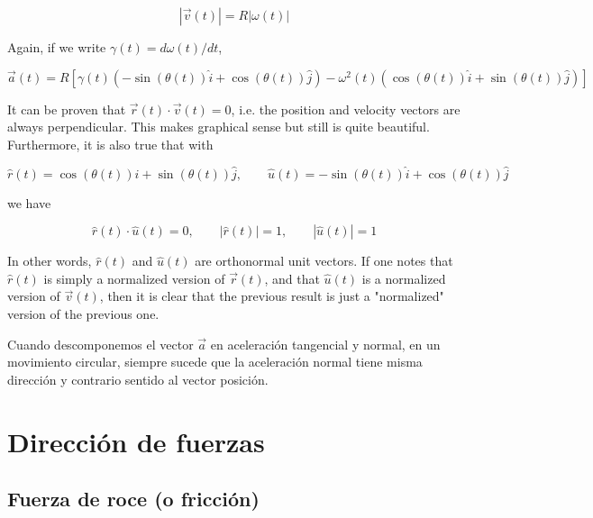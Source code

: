 \documentclass[12pt]{article}
\theoremstyle{definition}
\begin{document}
\begin{equation}
    \left| \vec{v}(t) \right| = R \left| \omega(t) \right|
\end{equation}

Again, if we write $\gamma(t) = d\omega(t) / dt$, 

\begin{equation}
    \vec{a}(t) = R \left[ \gamma(t) \left( -\sin(\theta(t)) \hat{i} + \cos(\theta(t))
    \hat{j} \right) - \omega^2(t) \left( \cos(\theta(t)) \hat{i} + \sin(\theta(t))
    \hat{j} \right)  \right]
\end{equation}

It can be proven that $\vec{r}(t) \cdot \vec{v}(t) = 0$, i.e. the position and
velocity vectors are always perpendicular. This makes graphical sense but still
is quite beautiful. Furthermore, it is also true that  with 

\begin{equation*}
    \hat{r}(t) = \cos(\theta(t))\hat{i} + \sin(\theta(t))\hat{j}, \qquad
    \hat{u}(t) = - \sin(\theta(t))\hat{i} + \cos(\theta(t))\hat{j}
\end{equation*}

we have 

\begin{equation}
    \hat{r}(t) \cdot \hat{u}(t) = 0, \qquad \left| \hat{r}(t) \right| = 1,
    \qquad \left| \hat{u}(t) \right| = 1
\end{equation}

In other words, $\hat{r}(t)$ and $\hat{u}(t)$ are orthonormal unit vectors. If
one notes that $\hat{r}(t)$ is simply a normalized version of $\vec{r}(t)$, and 
that $\hat{u}(t)$ is a normalized version of $\vec{v}(t)$, then it is clear that
the previous result is just a "normalized" version of the previous one. 

Cuando descomponemos el vector $\vec{a}$ en aceleración tangencial y normal, 
en un movimiento circular, siempre sucede que la aceleración normal tiene misma
dirección y contrario sentido al vector posición.


\pagebreak 

\section{Dirección de fuerzas}

\subsection{Fuerza de roce (o fricción)}
\end{document}
